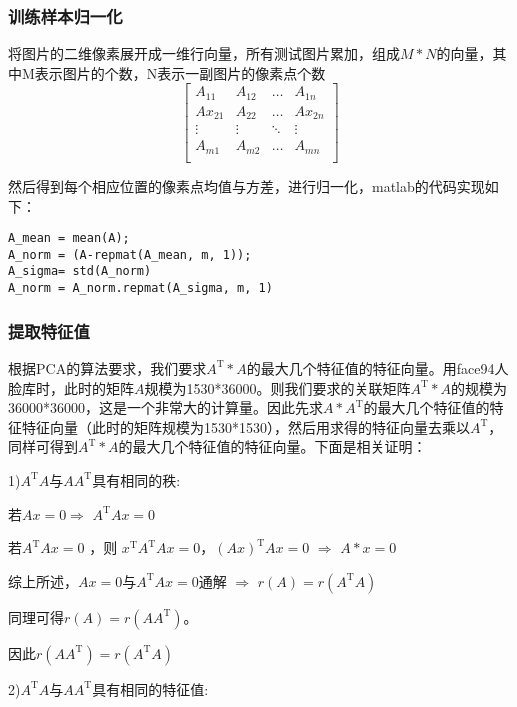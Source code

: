 \documentclass[a4paper,12pt]{ctexart}
\begin{document}
\subsubsection{训练样本归一化}

将图片的二维像素展开成一维行向量，所有测试图片累加，组成$M*N$的向量，其中M表示图片的个数，N表示一副图片的像素点个数
\[
\begin{bmatrix}
A_{11} & A_{12} & \ldots & A_{1n}\\
Ax_{21} & A_{22} & \ldots & Ax_{2n}\\
\vdots & \vdots & \ddots & \vdots\\
A_{m1} & A_{m2} & \ldots & A_{mn}\\
\end{bmatrix}
\]

然后得到每个相应位置的像素点均值与方差，进行归一化，matlab的代码实现如下：

\begin{lstlisting}
A_mean = mean(A);
A_norm = (A-repmat(A_mean, m, 1));
A_sigma= std(A_norm)
A_norm = A_norm.repmat(A_sigma, m, 1)
\end{lstlisting}

\subsubsection{提取特征值}

根据PCA的算法要求，我们要求$A^\mathrm{T}*A$的最大几个特征值的特征向量。用face94人脸库时，此时的矩阵$A$规模为1530*36000。则我们要求的关联矩阵$A^\mathrm{T}*A$的规模为36000*36000，这是一个非常大的计算量。因此先求$A*A^\mathrm{T}$的最大几个特征值的特征特征向量（此时的矩阵规模为1530*1530），然后用求得的特征向量去乘以$A^\mathrm{T}$，同样可得到$A^\mathrm{T}*A$的最大几个特征值的特征向量。下面是相关证明：

1)$A^\mathrm{T}A$与$AA^\mathrm{T}$具有相同的秩:

若$Ax=0$\quad $\Longrightarrow$ \quad$A^\mathrm{T}Ax=0 $

若$A^\mathrm{T}Ax=0 $ ，则 $x^\mathrm{T}A^\mathrm{T}Ax=0 $，$(Ax)^\mathrm{T}Ax=0$ \quad $\Longrightarrow$ \quad $A*x=0$

综上所述，$Ax=0$与$A^\mathrm{T}Ax=0$通解 \quad $\Longrightarrow$ \quad $r(A)=r(A^\mathrm{T}A)$

同理可得$r(A)=r(AA^\mathrm{T})$。

因此$r(AA^\mathrm{T})=r(A^\mathrm{T}A)$
\newline

2)$A^\mathrm{T}A$与$AA^\mathrm{T}$具有相同的特征值:
\end{document}
